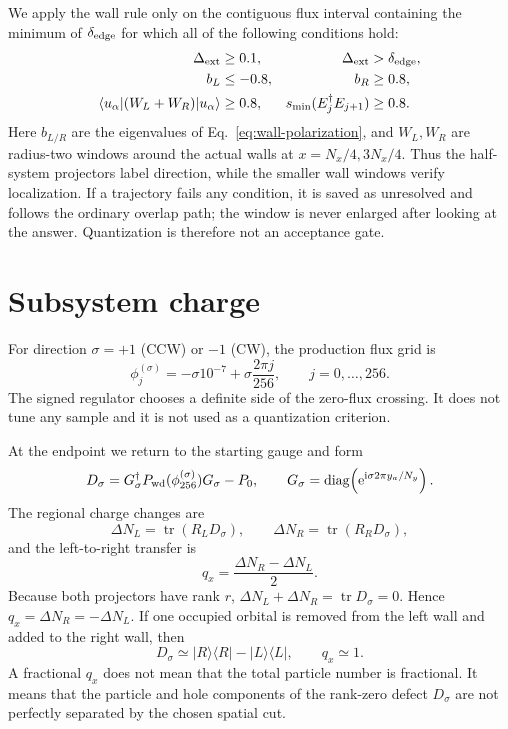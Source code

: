\documentclass[aps,prb,twocolumn,floatfix,nofootinbib,superscriptaddress]{revtex4-2}
\newcommand{\ii}{\mathrm{i}}
\newcommand{\tr}{\operatorname{tr}}
\newcommand{\e}{\mathrm{e}}
\newcommand{\ketbra}[2]{\lvert #1\rangle\langle #2\rvert}
\begin{document}
We apply the wall rule only on the contiguous flux interval containing the
minimum of $\delta_{\rm edge}$ for which all of the following conditions
hold:
\begin{align}
 \Delta_{\rm ext}&\ge0.1, & \Delta_{\rm ext}&>\delta_{\rm edge},\nonumber\\
 b_L&\le-0.8, & b_R&\ge0.8,\nonumber\\
 \langle u_\alpha|(W_L+W_R)|u_\alpha\rangle&\ge0.8,
 & s_{\min}(E_j^\dagger E_{j+1})&\ge0.8.
 \label{eq:qualification}
\end{align}
Here $b_{L/R}$ are the eigenvalues of Eq.~\eqref{eq:wall-polarization}, and
$W_L,W_R$ are radius-two windows around the actual walls at
$x=N_x/4,3N_x/4$.  Thus the half-system projectors label direction, while
the smaller wall windows verify localization.  If a trajectory fails any
condition, it is saved as unresolved and follows the ordinary overlap path;
the window is never enlarged after looking at the answer.  Quantization is
therefore not an acceptance gate.

\section{Subsystem charge}

For direction $\sigma=+1$ (CCW) or $-1$ (CW), the production flux grid is
\begin{equation}
 \phi_j^{(\sigma)}=-\sigma10^{-7}
 +\sigma\frac{2\pi j}{256},\qquad j=0,\ldots,256 .
 \label{eq:flux-grid}
\end{equation}
The signed regulator chooses a definite side of the zero-flux crossing.  It
does not tune any sample and it is not used as a quantization criterion.

At the endpoint we return to the starting gauge and form
\begin{equation}
 D_\sigma
 =G_\sigma^\dagger P_{\rm wd}(\phi_{256}^{(\sigma)})G_\sigma-P_0,
 \qquad
 G_\sigma=\operatorname{diag}\!\left(
 \e^{\ii\sigma2\pi y_a/N_y}\right).
 \label{eq:defect}
\end{equation}
The regional charge changes are
\begin{equation}
 \Delta N_L=\tr(R_LD_\sigma),\qquad
 \Delta N_R=\tr(R_RD_\sigma),
 \label{eq:regional-charges}
\end{equation}
and the left-to-right transfer is
\begin{equation}
 q_x=\frac{\Delta N_R-\Delta N_L}{2}.
 \label{eq:qx}
\end{equation}
Because both projectors have rank $r$,
$\Delta N_L+\Delta N_R=\tr D_\sigma=0$.  Hence $q_x=\Delta N_R=-\Delta N_L$.
If one occupied orbital is removed from the left wall and added to the right
wall, then
\begin{equation}
 D_\sigma\simeq\ketbra{R}{R}-\ketbra{L}{L},
 \qquad q_x\simeq1.
 \label{eq:one-particle-defect}
\end{equation}
A fractional $q_x$ does not mean that the total particle number is
fractional.  It means that the particle and hole components of the rank-zero
defect $D_\sigma$ are not perfectly separated by the chosen spatial cut.
\end{document}
